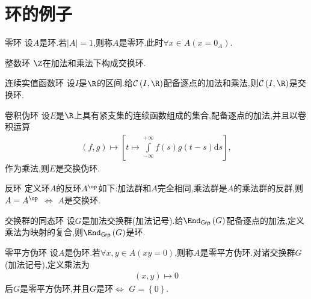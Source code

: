 \section{环的例子}

\begin{example}{零环}{}
	设$A$是环.若$\left|A\right|=1$,则称$A$是零环.此时$\forall x\in A\left(x=0_{A}\right)$.
\end{example}

\begin{example}{整数环}{}
	$\Z$在加法和乘法下构成交换环.
\end{example}

\begin{example}{连续实值函数环}{}
	设$I$是$\R$的区间.给$\mathcal{C}\left(I,\R\right)$配备逐点的加法和乘法,则$\mathcal{C}\left(I,\R\right)$是交换环.
\end{example}

\begin{example}{卷积伪环}{}
	设$E$是$\R$上具有紧支集的连续函数组成的集合,配备逐点的加法,并且以卷积运算
	\begin{align*}
		\left(f,g\right)\mapsto\left[t\mapsto\int\limits_{-\infty}^{+\infty}f\left(s\right)g\left(t-s\right)\mathrm{d}s\right],
	\end{align*}
	作为乘法,则$E$是交换伪环.
\end{example}

\begin{example}{反环}{}
	定义环$A$的反环$A^{\op}$如下:加法群和$A$完全相同,乘法群是$A$的乘法群的反群,则$A=A^{\op}$ $\iff$ $A$是交换环.
\end{example}

\begin{example}{交换群的同态环}{}
	设$G$是加法交换群(加法记号).给$\End_{\mathsf{Grp}}\left(G\right)$配备逐点的加法,定义乘法为映射的复合,则$\End_{\mathsf{Grp}}\left(G\right)$是环.
\end{example}

\begin{example}{零平方伪环}{}
	设$A$是伪环.若$\forall x,y\in A\left(xy=0\right)$,则称$A$是零平方伪环.对诸交换群$G$(加法记号),定义乘法为
	\begin{align*}
		\left(x,y\right)\mapsto 0
	\end{align*}
	后$G$是零平方伪环,并且$G$是环$\iff$ $G=\left\{0\right\}$.
\end{example}











































